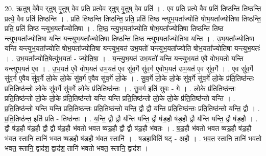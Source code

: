 \documentclass[17pt]{extarticle}
\begin{document}
20. ऋ॒तुष् वे॒वैव र्‌तुष् वृ॒तुष् वे॒व प्रति॒ प्रत्ये॒व र्‌तुष् वृ॒तुष् वे॒व प्रति॑ । . ए॒व प्रति॒ प्रत्ये॒ वैव प्रति॑ तिष्ठन्ति तिष्ठन्ति॒ प्रत्ये॒ वैव प्रति॑ तिष्ठन्ति । . प्रति॑ तिष्ठन्ति तिष्ठन्ति॒ प्रति॒ प्रति॑ तिष्ठ न्त्युभ॒यता᳚ज्योति षोभ॒यता᳚ज्योतिषा तिष्ठन्ति॒ प्रति॒ प्रति॑ तिष्ठ न्त्युभ॒यता᳚ज्योतिषा । . ति॒ष्ठ॒ न्त्यु॒भ॒यता᳚ज्योति षोभ॒यता᳚ज्योतिषा तिष्ठन्ति तिष्ठ न्त्युभ॒यता᳚ज्योतिषा यन्ति यन्त्युभ॒यता᳚ज्योतिषा तिष्ठन्ति तिष्ठ न्त्युभ॒यता᳚ज्योतिषा यन्ति । . उ॒भ॒यता᳚ज्योतिषा यन्ति यन्त्युभ॒यता᳚ज्योति षोभ॒यता᳚ज्योतिषा यन्त्युभ॒यत॑ उभ॒यतो॑ यन्त्युभ॒यता᳚ज्योति
षोभ॒यता᳚ज्योतिषा यन्त्युभ॒यतः॑ । . उ॒भ॒यता᳚ज्योति॒षेत्यु॑भ॒यतः॑ - ज्यो॒ति॒षा॒ । . य॒न्त्यु॒भ॒यत॑ उभ॒यतो॑ यन्ति यन्त्युभ॒यत॑ ए॒वै वोभ॒यतो॑ यन्ति यन्त्युभ॒यत॑ ए॒व । . उ॒भ॒यत॑ ए॒वै वोभ॒यत॑ उभ॒यत॑ ए॒व सु॑व॒र्गे सु॑व॒र्ग ए॒वोभ॒यत॑ उभ॒यत॑ ए॒व सु॑व॒र्गे । . ए॒व सु॑व॒र्गे सु॑व॒र्ग ए॒वैव सु॑व॒र्गे लो॒के लो॒के सु॑व॒र्ग ए॒वैव सु॑व॒र्गे लो॒के । . सु॒व॒र्गे लो॒के लो॒के सु॑व॒र्गे सु॑व॒र्गे लो॒के प्र॑ति॒तिष्ठ॑न्तः प्रति॒तिष्ठ॑न्तो लो॒के सु॑व॒र्गे सु॑व॒र्गे लो॒के प्र॑ति॒तिष्ठ॑न्तः । . सु॒व॒र्ग इति॑ सुवः - गे । . लो॒के प्र॑ति॒तिष्ठ॑न्तः प्रति॒तिष्ठ॑न्तो लो॒के लो॒के प्र॑ति॒तिष्ठ॑न्तो यन्ति यन्ति प्रति॒तिष्ठ॑न्तो लो॒के लो॒के प्र॑ति॒तिष्ठ॑न्तो यन्ति । . प्र॒ति॒तिष्ठ॑न्तो यन्ति यन्ति प्रति॒तिष्ठ॑न्तः प्रति॒तिष्ठ॑न्तो यन्ति॒ द्वौ द्वौ य॑न्ति प्रति॒तिष्ठ॑न्तः प्रति॒तिष्ठ॑न्तो यन्ति॒ द्वौ । . प्र॒ति॒तिष्ठ॑न्त॒ इति॑ प्रति - तिष्ठ॑न्तः । . य॒न्ति॒ द्वौ द्वौ य॑न्ति यन्ति॒ द्वौ ष॑ड॒हौ ष॑ड॒हौ द्वौ य॑न्ति यन्ति॒ द्वौ ष॑ड॒हौ । . द्वौ ष॑ड॒हौ ष॑ड॒हौ द्वौ द्वौ ष॑ड॒हौ भ॑वतो भवत ष्षड॒हौ द्वौ द्वौ ष॑ड॒हौ भ॑वतः । . ष॒ड॒हौ भ॑वतो भवत ष्षड॒हौ ष॑ड॒हौ भ॑वत॒ स्तानि॒ तानि॑ भवत ष्षड॒हौ ष॑ड॒हौ भ॑वत॒ स्तानि॑ । . ष॒ड॒हाविति॑ षट् - अ॒हौ । . भ॒व॒त॒ स्तानि॒ तानि॑ भवतो भवत॒ स्तानि॒ द्वाद॑श॒ द्वाद॑श॒ तानि॑ भवतो भवत॒ स्तानि॒ द्वाद॑श । \newline
\end{document}
